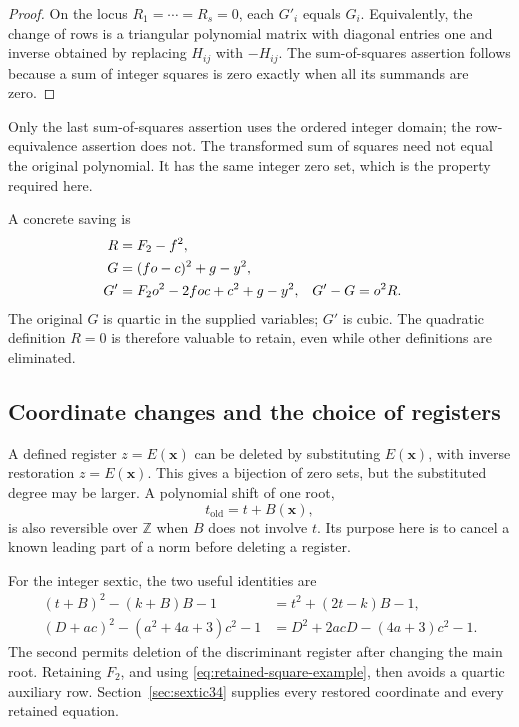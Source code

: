 \documentclass[11pt,a4paper]{article}
\theoremstyle{definition}
\newcommand{\Z}{\mathbb Z}
\begin{document}
\begin{proof}
On the locus \(R_1=\cdots=R_s=0\), each \(G'_i\) equals \(G_i\).
Equivalently, the change of rows is a triangular polynomial matrix
with diagonal entries one and inverse obtained by replacing
\(H_{ij}\) with \(-H_{ij}\).  The sum-of-squares assertion follows
because a sum of integer squares is zero exactly when all its
summands are zero.
\end{proof}

Only the last sum-of-squares assertion uses the ordered integer domain;
the row-equivalence assertion does not.  The transformed sum of squares
need not equal the original polynomial.  It has the same integer zero
set, which is the property required here.

A concrete saving is
\begin{align}
 R&=F_2-f^2, \notag\\
 G&=(fo-c)^2+g-y^2, \notag\\
 G'&=F_2o^2-2foc+c^2+g-y^2,
 &G'-G&=o^2R.
 \label{eq:retained-square-example}
\end{align}
The original \(G\) is quartic in the supplied variables; \(G'\) is cubic.
The quadratic definition \(R=0\) is therefore valuable to retain, even
while other definitions are eliminated.

\subsection{Coordinate changes and the choice of registers}

A defined register \(z=E(\mathbf x)\) can be deleted by substituting
\(E(\mathbf x)\), with inverse restoration \(z=E(\mathbf x)\).
This gives a bijection of zero sets, but the substituted degree may be
larger.  A polynomial shift of one root,
\[
 t_{\mathrm{old}}=t+B(\mathbf x),
\]
is also reversible over \(\Z\) when \(B\) does not involve \(t\).
Its purpose here is to cancel a known leading part of a norm before
deleting a register.

For the integer sextic, the two useful identities are
\begin{align*}
 (t+B)^2-(k+B)B-1
   &=t^2+(2t-k)B-1,\\
 (D+ac)^2-(a^2+4a+3)c^2-1
   &=D^2+2acD-(4a+3)c^2-1.
\end{align*}
The second permits deletion of the discriminant register after changing
the main root.  Retaining \(F_2\), and using
\eqref{eq:retained-square-example}, then avoids a quartic auxiliary
row.  Section~\ref{sec:sextic34} supplies every restored coordinate and
every retained equation.
\end{document}
